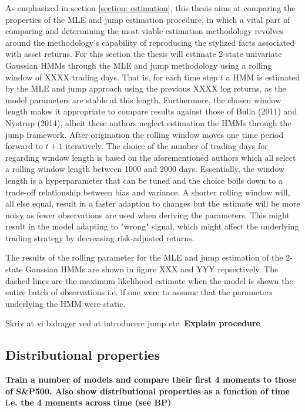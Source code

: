 As emphasized in section \ref{section: estimation}, this thesis aims at comparing the properties of the MLE and jump estimation procedure, in which a vital part of comparing and determining the most viable estimation methodology revolves around the methodology's capability of reproducing the stylized facts associated with asset returns. For this section the thesis will estimate 2-state univariate Gaussian HMMs through the MLE and jump methodology using a rolling window of XXXX trading days. That is, for each time step $t$ a HMM is estimated by the MLE and jump approach using the previous XXXX log returns, as the model parameters are stable at this length. Furthermore, the chosen window length makes it appropriate to compare results against those of Bulla (2011) and Nystrup (2014), albeit these authors neglect estimation the HMMs through the jump framework. After origination the rolling window moves one time period forward to $t+1$ iteratively. The choice of the number of trading days for regarding window length is based on the aforementioned authors which all select a rolling window length between 1000 and 2000 days. Essentially, the window length is a hyperparameter that can be tuned and the choice boils down to a trade-off relationship between bias and variance. A shorter rolling window will, all else equal, result in a faster adaption to changes but the estimate will be more noisy as fewer observations are used when deriving the parameters. This might result in the model adapting to "wrong" signal, which might affect the underlying trading strategy by decreasing risk-adjusted returns. 

The results of the rolling parameter for the MLE and jump estimation of the 2-state Gaussian HMMs are shown in figure XXX and YYY repsectively. The dashed lines are the maximum likelihood estimate when the model is shown the entire batch of observations i.e. if one were to assume that the parameters underlying the HMM were static. 



Skriv at vi bidrager ved at introducere jump etc. 
\textbf{Explain procedure}

\subsection{Distributional properties}

\textbf{Train a number of models and compare their first 4 moments to those of S\&P500. Also show distributional properties as a function of time i.e. the 4 moments across time (see BP)}


